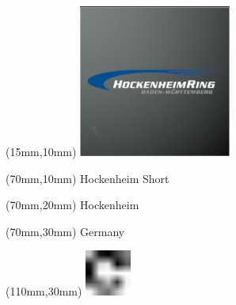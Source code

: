 \null\newpage
\begin{textblock*}{50mm}(15mm,10mm)%
\includegraphics[width=50mm]{LG/2015-05-20_00082.png}
\end{textblock*}
\begin{textblock*}{130mm}(70mm,10mm)%
{\fontsize{20}{20}\selectfont Hockenheim Short}\\
\end{textblock*}
\begin{textblock*}{120mm}(70mm,20mm)%
{\fontsize{16}{16}\selectfont Hockenheim}\\
\end{textblock*}
\begin{textblock*}{120mm}(70mm,30mm)%
{\fontsize{12}{12}\selectfont Germany}
\end{textblock*}
\begin{textblock*}{30mm}(110mm,30mm)%
\centering
\includegraphics[height=15mm]{icons/fa-rotate-right.pdf}
\end{textblock*}
